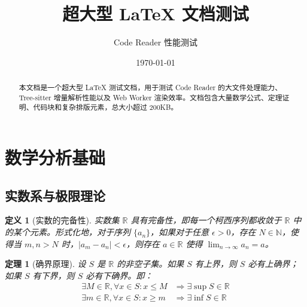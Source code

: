 \documentclass[12pt]{article}
\title{超大型 LaTeX 文档测试}
\author{Code Reader 性能测试}
\date{\today}
\newtheorem{theorem}{定理}[section]
\newtheorem{definition}{定义}[section]
\begin{document}
\maketitle

\begin{abstract}
本文档是一个超大型 LaTeX 测试文档，用于测试 Code Reader 的大文件处理能力、Tree-sitter 增量解析性能以及 Web Worker 渲染效率。文档包含大量数学公式、定理证明、代码块和复杂排版元素，总大小超过 200KB。
\end{abstract}

\tableofcontents

\newpage


\section{数学分析基础}

\subsection{实数系与极限理论}

\begin{definition}[实数的完备性]
实数集 $\mathbb{R}$ 具有完备性，即每一个柯西序列都收敛于 $\mathbb{R}$ 中的某个元素。形式化地，对于序列 $\{a_n\}$，如果对于任意 $\epsilon > 0$，存在 $N \in \mathbb{N}$，使得当 $m, n > N$ 时，$|a_m - a_n| < \epsilon$，则存在 $a \in \mathbb{R}$ 使得 $\lim_{n \to \infty} a_n = a$。
\end{definition}

\begin{theorem}[确界原理]
设 $S$ 是 $\mathbb{R}$ 的非空子集。如果 $S$ 有上界，则 $S$ 必有上确界；如果 $S$ 有下界，则 $S$ 必有下确界。即：
\begin{align}
\exists M \in \mathbb{R}, \forall x \in S: x \leq M &\Rightarrow \exists \sup S \in \mathbb{R} \\
\exists m \in \mathbb{R}, \forall x \in S: x \geq m &\Rightarrow \exists \inf S \in \mathbb{R}
\end{align}
\end{theorem}
\end{document}
